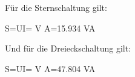 {\begin{itemize}
              Für die Sternschaltung gilt:
              \begin{eqa}
                  S=\cdot U\cdot I= V  A=15.934 VA \notag
              \end{eqa}
              
              Und für die Dreieckschaltung gilt:
              \begin{eqa}
                  S=\cdot U\cdot I= V  A=47.804 VA \notag
              \end{eqa}
              
    \end{itemize}
    
}